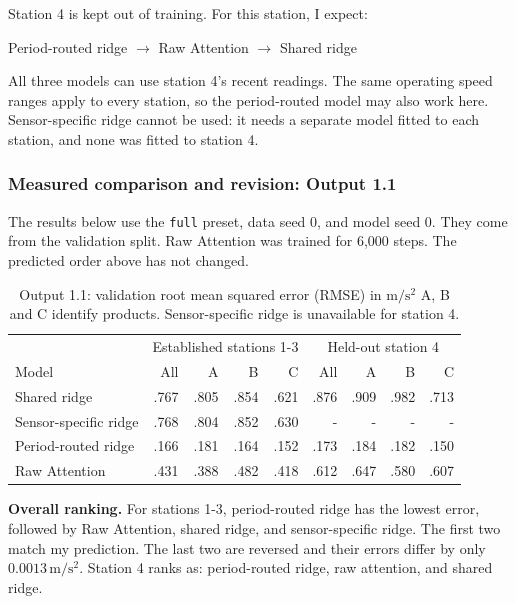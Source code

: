 \documentclass[11pt,a4paper]{article}
\begin{document}
Station 4 is kept out of training. For this station, I expect:
\begin{center}
Period-routed ridge $\rightarrow$ Raw Attention $\rightarrow$ Shared ridge
\end{center}

All three models can use station 4's recent readings. The same operating speed
ranges apply to every station, so the period-routed model may also work here.
Sensor-specific ridge cannot be used: it needs a separate model fitted to each
station, and none was fitted to station 4.

\clearpage
\subsubsection*{Measured comparison and revision: Output 1.1}

The results below use the \texttt{full} preset, data seed 0, and model seed 0.
They come from the validation split. Raw Attention was trained for
6,000 steps. The predicted order above has not changed.

\begin{table}[ht]
\centering
\small
\setlength{\tabcolsep}{4pt}
\begin{tabular}{lrrrrrrrr}
\hline
& \multicolumn{4}{c}{Established stations 1-3}
& \multicolumn{4}{c}{Held-out station 4} \\
Model & All & A & B & C & All & A & B & C \\
\hline
Shared ridge & .767 & .805 & .854 & .621 & .876 & .909 & .982 & .713 \\
Sensor-specific ridge & .768 & .804 & .852 & .630 & - & - & - & - \\
Period-routed ridge & .166 & .181 & .164 & .152 & .173 & .184 & .182 & .150 \\
Raw Attention & .431 & .388 & .482 & .418 & .612 & .647 & .580 & .607 \\
\hline
\end{tabular}
\caption{Output 1.1: validation root mean squared error (RMSE) in
$\mathrm{m/s^2}$
A, B and C identify products. Sensor-specific ridge is unavailable for station 4.}
\label{tab:comparison}
\end{table}

\textbf{Overall ranking.}
For stations 1-3, period-routed ridge has the lowest error, followed by Raw
Attention, shared ridge, and sensor-specific ridge. The first two match my
prediction. The last two are reversed and their errors differ by only
$0.0013\,\mathrm{m/s^2}$. Station 4 ranks as: period-routed
ridge, raw attention, and shared ridge.
\end{document}
